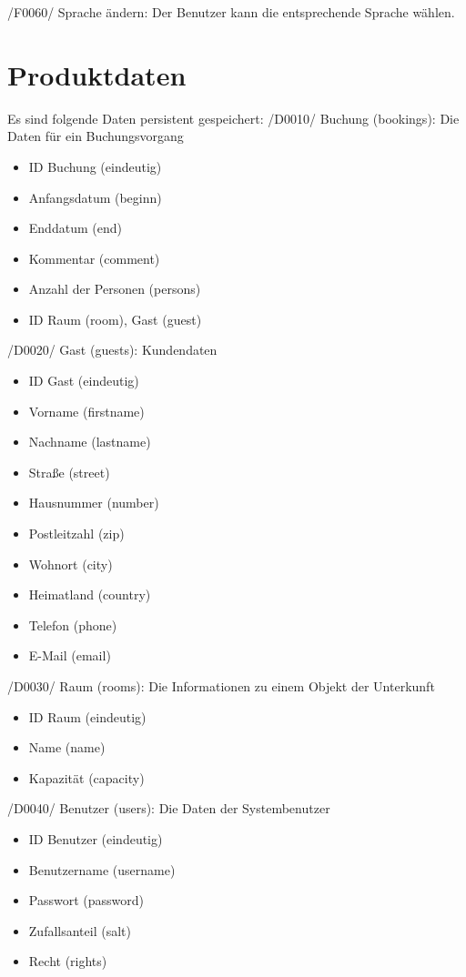 \documentclass[a4paper,oneside]{scrreprt}
\begin{document}
/F0060/ Sprache ändern: 
Der Benutzer kann die entsprechende Sprache wählen.


\chapter{Produktdaten}
Es sind folgende Daten persistent gespeichert:
/D0010/ Buchung (bookings): Die Daten für ein Buchungsvorgang
\begin{itemize}
\item ID Buchung (eindeutig)
\item Anfangsdatum (beginn)
\item Enddatum (end)
\item Kommentar (comment)
\item Anzahl der Personen (persons)
\item ID Raum (room), Gast (guest)
\end{itemize}

/D0020/ Gast (guests): Kundendaten
\begin{itemize}
\item ID Gast (eindeutig)
\item Vorname (firstname)
\item Nachname (lastname)
\item Straße (street)
\item Hausnummer (number)
\item Postleitzahl (zip)
\item Wohnort (city)
\item Heimatland (country)
\item Telefon (phone)
\item E-Mail (email)
\end{itemize}


/D0030/ Raum (rooms): Die Informationen zu einem Objekt der Unterkunft
\begin{itemize}
\item ID Raum (eindeutig)
\item Name (name)
\item Kapazität (capacity)
\end{itemize}

/D0040/ Benutzer (users): Die Daten der Systembenutzer
\begin{itemize}
\item ID Benutzer (eindeutig)
\item Benutzername (username)
\item Passwort (password)
\item Zufallsanteil (salt)
\item Recht (rights)
\end{itemize}
\end{document}

